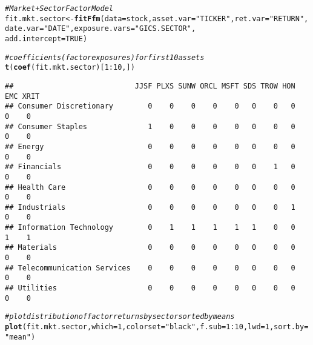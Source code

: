 \documentclass[a4paper]{article}\usepackage[]{graphicx}\usepackage[]{color}
\makeatletter
\newcommand{\hlnum}[1]{\textcolor[rgb]{0.686,0.059,0.569}{#1}}%
\newcommand{\hlstr}[1]{\textcolor[rgb]{0.192,0.494,0.8}{#1}}%
\newcommand{\hlcom}[1]{\textcolor[rgb]{0.678,0.584,0.686}{\textit{#1}}}%
\newcommand{\hlopt}[1]{\textcolor[rgb]{0,0,0}{#1}}%
\newcommand{\hlstd}[1]{\textcolor[rgb]{0.345,0.345,0.345}{#1}}%
\newcommand{\hlkwb}[1]{\textcolor[rgb]{0.69,0.353,0.396}{#1}}%
\newcommand{\hlkwc}[1]{\textcolor[rgb]{0.333,0.667,0.333}{#1}}%
\newcommand{\hlkwd}[1]{\textcolor[rgb]{0.737,0.353,0.396}{\textbf{#1}}}%
\newenvironment{kframe}{%
 \def\at@end@of@kframe{}%
 \ifinner\ifhmode%
  \def\at@end@of@kframe{\end{minipage}}%
  \begin{minipage}{\columnwidth}%
 \fi\fi%
 \def\FrameCommand##1{\hskip\@totalleftmargin \hskip-\fboxsep
 \colorbox{shadecolor}{##1}\hskip-\fboxsep
     \hskip-\linewidth \hskip-\@totalleftmargin \hskip\columnwidth}%
 \MakeFramed {\advance\hsize-\width
   \@totalleftmargin\z@ \linewidth\hsize
   \@setminipage}}%
 {\par\unskip\endMakeFramed%
 \at@end@of@kframe}
\newenvironment{knitrout}{}{} %
\makeatother
\begin{document}
\begin{knitrout}
\color{fgcolor}\begin{kframe}
\begin{alltt}
\hlcom{# Market + Sector Factor Model}
\hlstd{fit.mkt.sector} \hlkwb{<-} \hlkwd{fitFfm}\hlstd{(}\hlkwc{data}\hlstd{=stock,} \hlkwc{asset.var}\hlstd{=}\hlstr{"TICKER"}\hlstd{,} \hlkwc{ret.var}\hlstd{=}\hlstr{"RETURN"}\hlstd{,}
                         \hlkwc{date.var}\hlstd{=}\hlstr{"DATE"}\hlstd{,} \hlkwc{exposure.vars}\hlstd{=}\hlstr{"GICS.SECTOR"}\hlstd{,}
                         \hlkwc{add.intercept}\hlstd{=}\hlnum{TRUE}\hlstd{)}

\hlcom{# coefficients (factor exposures) for first 10 assets}
\hlkwd{t}\hlstd{(}\hlkwd{coef}\hlstd{(fit.mkt.sector)[}\hlnum{1}\hlopt{:}\hlnum{10}\hlstd{,])}
\end{alltt}
\begin{verbatim}
##                            JJSF PLXS SUNW ORCL MSFT SDS TROW HON EMC XRIT
## Consumer Discretionary        0    0    0    0    0   0    0   0   0    0
## Consumer Staples              1    0    0    0    0   0    0   0   0    0
## Energy                        0    0    0    0    0   0    0   0   0    0
## Financials                    0    0    0    0    0   0    1   0   0    0
## Health Care                   0    0    0    0    0   0    0   0   0    0
## Industrials                   0    0    0    0    0   0    0   1   0    0
## Information Technology        0    1    1    1    1   1    0   0   1    1
## Materials                     0    0    0    0    0   0    0   0   0    0
## Telecommunication Services    0    0    0    0    0   0    0   0   0    0
## Utilities                     0    0    0    0    0   0    0   0   0    0
\end{verbatim}
\end{kframe}
\end{knitrout}

\begin{knitrout}
\color{fgcolor}\begin{kframe}
\begin{alltt}
\hlcom{# plot distribution of factor returns by sector sorted by means}
\hlkwd{plot}\hlstd{(fit.mkt.sector,} \hlkwc{which}\hlstd{=}\hlnum{1}\hlstd{,} \hlkwc{colorset}\hlstd{=}\hlstr{"black"}\hlstd{,} \hlkwc{f.sub}\hlstd{=}\hlnum{1}\hlopt{:}\hlnum{10}\hlstd{,} \hlkwc{lwd}\hlstd{=}\hlnum{1}\hlstd{,} \hlkwc{sort.by}\hlstd{=}\hlstr{"mean"}\hlstd{)}
\end{alltt}


{\ttfamily\noindent\bfseries\color{errorcolor}{\#\# Error in xy.coords(x, y, xlabel, ylabel, log): 'x' is a list, but does not have components 'x' and 'y'}}\end{kframe}
\end{knitrout}
\end{document}
